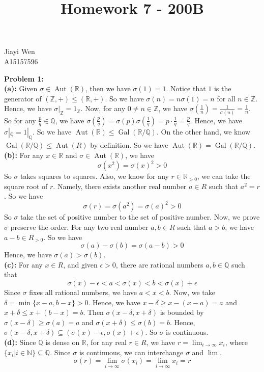 \documentclass[12pt]{amsart}
\newcommand{\R}{\mathbb{R}}
\newcommand{\Q}{\mathbb{Q}}
\newcommand{\Z}{\mathbb{Z}}
\newcommand{\N}{\mathbb{N}}
\newcommand{\Aut}[0]{\operatorname{Aut}}
\newcommand{\Gal}[0]{\operatorname{Gal}}
\begin{document}
\title{Homework 7 - 200B}
\maketitle
\begin{center}
    Jiayi Wen\\
    A15157596
\end{center}
\textbf{Problem 1:} \\
\textbf{(a):} Given $\sigma\in\Aut(\R)$, then we have $\sigma(1)=1$. Notice that $1$ is the generator of $(\Z,+)\leq (\R,+)$. So we have $\sigma(n)=n\sigma(1)=n$ for all $n\in \Z$. Hence, we have $\sigma|_\Z=1_\Z$. Now, for any $0\neq n\in \Z$, we have $\sigma(\frac{1}{n})=\frac{1}{\sigma(n)}=\frac{1}{n}$. So for any $\frac{p}{q}\in \Q$, we have $\sigma(\frac{p}{q})=\sigma(p)\sigma(\frac{1}{q})=p\cdot \frac{1}{q}=\frac{p}{q}$. Hence, we have $\sigma|_\Q=1|_\Q$. So we have $\Aut(\R)\leq \Gal(\R/\Q)$. On the other hand, we know $\Gal(\R/\Q)\leq \Aut(R)$ by definition. So we have $\Aut(\R)=\Gal(\R/\Q)$.\\
\textbf{(b):} For any $x\in \R$ and $\sigma\in\Aut(\R)$, we have 
\[\sigma(x^2)=\sigma(x)^2>0\]
So $\sigma$ takes squares to squares. Also, we know for any $r\in\R_{>0}$, we can take the square root of $r$. Namely, there exists another real number $a\in R$ such that $a^2=r$. So we have 
\[\sigma(r)=\sigma(a^2)=\sigma(a)^2>0\]
So $\sigma$ take the set of positive number to the set of positive number. Now, we prove $\sigma$ preserve the order. For any two real number $a,b\in R$ such that $a>b$, we have $a-b\in R_{>0}$. So we have 
\[\sigma(a)-\sigma(b)=\sigma(a-b)>0\]
Hence, we have $\sigma(a)>\sigma(b)$.\\
\textbf{(c): }For any $x\in R$, and given $\epsilon>0$, there are rational numbers $a,b\in \Q$ such that 
$$\sigma(x)-\epsilon<a<\sigma(x)<b<\sigma(x)+\epsilon$$
Since $\sigma$ fixes all rational numbers, we have $a<x<b$. Now, we take $\delta= \min\{x-a,b-x\}>0$. Hence, we have $x-\delta\geq x-(x-a)=a$ and $x+\delta\leq x+(b-x)=b$. Then $\sigma(x-\delta,x+\delta)$ is bounded by $\sigma(x-\delta)\geq \sigma(a)=a$ and $\sigma(x+\delta)\leq\sigma(b)=b$. Hence, $\sigma(x-\delta,x+\delta)\subseteq (\sigma(x)-\epsilon,\sigma(x)+\epsilon)$. So $\sigma$ is continuous.\\
\textbf{(d):} Since $\Q$ is dense on $\R$, for any real $r\in R$, we have $r=\lim_{i\to \infty} x_i$, where $\{x_i|i\in \N\}\subseteq \Q$. Since $\sigma$ is continuous, we can interchange $\sigma$ and $\lim$. 
\[\sigma(r)=\lim_{i\to \infty}\sigma(x_i)=\lim_{i\to \infty}x_i=r\]
\end{document}
